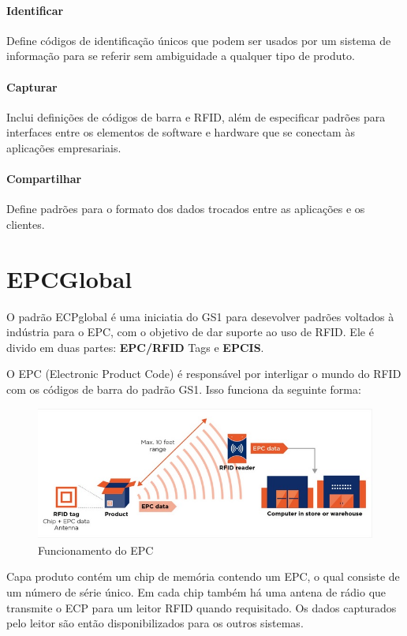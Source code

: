\documentclass[a4paper,12pt,titlepage]{article}
\begin{document}
	\paragraph{Identificar} Define códigos de identificação únicos que podem ser usados por um sistema de informação para se referir sem ambiguidade a qualquer tipo de produto.
	\paragraph{Capturar} Inclui definições de códigos de barra e RFID, além de especificar padrões para interfaces entre os elementos de software e hardware que se conectam às aplicações empresariais.
	\paragraph{Compartilhar} Define padrões para o formato dos dados trocados entre as aplicações e os clientes.     

\section{EPCGlobal}
	O padrão ECPglobal é uma iniciatia do GS1 para desevolver padrões voltados à indústria para o EPC, com o objetivo de dar suporte ao uso de RFID. Ele é divido em duas partes: \textbf{EPC/RFID} Tags e \textbf{EPCIS}. 
	
	O EPC (Electronic Product Code) é responsável por interligar o mundo do RFID com os códigos de barra do padrão GS1. Isso funciona da seguinte forma:
		\begin{figure}[h!]
			\centering
			\includegraphics[width=0.7\linewidth]{epcrfid}
			\caption{Funcionamento do EPC}
			\label{fig:epcrfid}
		\end{figure}
	
	Capa produto contém um chip de memória contendo um EPC, o qual consiste de um número de série único. Em cada chip também há uma antena de rádio que transmite o ECP para um leitor RFID quando requisitado. Os dados capturados pelo leitor são então disponibilizados para os outros sistemas.
	
\end{document}
